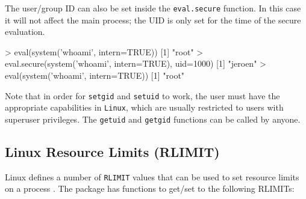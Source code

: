 \documentclass[article]{jss}
\begin{document}
The user/group ID can also be set inside the \texttt{eval.secure} function. In
this case it will not affect the main process; the UID is only set for the time
of the secure evaluation.

\begin{CodeChunk}
\begin{CodeInput}
> eval(system('whoami', intern=TRUE))
[1] "root"
> eval.secure(system('whoami', intern=TRUE), uid=1000)
[1] "jeroen"
> eval(system('whoami', intern=TRUE))
[1] "root"
\end{CodeInput}
\end{CodeChunk}

Note that in order for \texttt{setgid} and \texttt{setuid} to work, the user
must have the appropriate capabilities in \texttt{Linux}, which are usually
restricted to users with superuser privileges. The \texttt{getuid} and
\texttt{getgid} functions can be called by anyone.

\subsection{Linux Resource Limits (RLIMIT)}
\label{RLIMITS}

Linux defines a number of \texttt{RLIMIT} values that can be used to set
resource limits on a process \citep{linuxrlimit}. The  package
has functions to get/set to the following RLIMITs:
\end{document}
